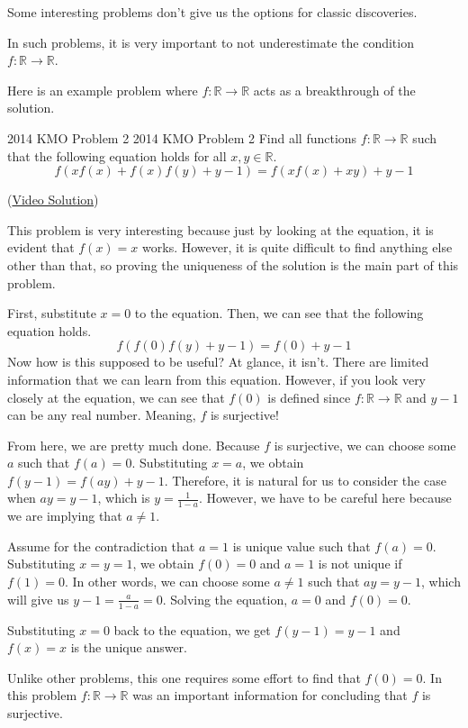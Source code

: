 \documentclass[../../../main.tex]{subfiles}
\begin{document}
Some interesting problems don't give us the options for classic
discoveries.

\begin{important}
In such problems, it is very important to not underestimate the
condition $f: \mathbb{R} \to \mathbb{R}$.
\end{important}

Here is an example problem where $f: \mathbb{R} \to \mathbb{R}$ acts
as a breakthrough of the solution.

\begin{problem}{2014 KMO Problem 2 \medium}{2014 KMO Problem 2}
Find all functions $f: \mathbb{R} \to \mathbb{R}$ such that the
following equation holds for all $x, y \in \mathbb{R}$.
\vspace{-0.8\baselineskip}
\[
f(xf(x) + f(x)f(y) + y - 1) = f(xf(x) + xy) + y - 1
\]
\end{problem}
(\href{https://youtu.be/OXDSWs-f9NA}{Video Solution})
\begin{solution}
This problem is very interesting because just by looking at the
equation, it is evident that $f(x) = x$ works. However, it is quite
difficult to find anything else other than that, so proving the
uniqueness of the solution is the main part of this problem.

First, substitute $x = 0$ to the equation. Then, we can see that
the following equation holds.
\[
f(f(0)f(y) + y - 1) = f(0) + y - 1
\]
Now how is this supposed to be useful? At glance, it isn't. There are
limited information that we can learn from this equation. However,
if you look very closely at the equation, we can see that $f(0)$ is
defined since $f: \mathbb{R} \to \mathbb{R}$ and $y - 1$ can be
any real number. Meaning, $f$ is surjective!

From here, we are pretty much done. Because $f$ is surjective,
we can choose some $a$ such that $f(a) = 0$. Substituting $x = a$,
we obtain $f(y - 1) = f(ay) + y - 1$. Therefore, it is natural for
us to consider the case when $ay = y - 1$, which is
$y = \frac{1}{1 - a}$. However, we have to be careful here because
we are implying that $a \neq 1$.

Assume for the contradiction that $a = 1$ is unique value such that
$f(a) = 0$. Substituting $x = y = 1$, we obtain $f(0) = 0$ and
$a = 1$ is not unique if $f(1) = 0$. In other words, we can choose
some $a \neq 1$ such that $ay = y - 1$, which will give us $y - 1
= \frac{a}{1 - a} = 0$. Solving the equation, $a = 0$ and $f(0) = 0$.

Substituting $x = 0$ back to the equation, we get $f(y - 1) = y - 1$
and $f(x) = x$ is the unique answer.
\end{solution}

Unlike other problems, this one requires some effort to find that
$f(0) = 0$. In this problem $f: \mathbb{R} \to \mathbb{R}$ was an
important information for concluding that $f$ is surjective.
\end{document}
